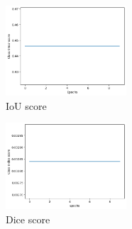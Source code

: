 \begin{figure}[htp!]
    \centering
    \includegraphics[width=0.4\textwidth]{Plots/iou}
    \caption{IoU score}
    \label{fig:iou}
\end{figure}

\begin{figure}[!]
    \centering
    \includegraphics[width=0.4\textwidth]{Plots/dice}
    \caption{Dice score}
    \label{fig:dice}
\end{figure}
